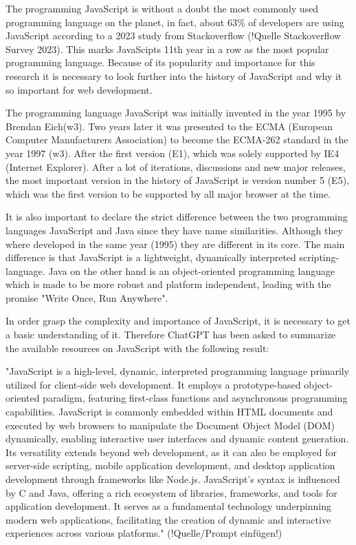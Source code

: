 The programming JavaScript is without a doubt the most commonly used programming language on the planet, in fact, about 63\% of developers are using JavaScript according to a 2023 study from Stackoverflow (!Quelle Stackoverflow Survey 2023). This marks JavaScipts 11th year in a row as the most popular programming language. Because of its popularity and importance for this research it is necessary to look further into the history of JavaScript and why it so important for web development.

The programming language JavaScript was initially invented in the year 1995 by Brendan Eich(w3). Two years later it was presented to the ECMA (European Computer Manufacturers Association) to become the ECMA-262 standard in the year 1997 (w3). After the first version (E1), which was solely supported by IE4 (Internet Explorer).
After a lot of iterations, discussions and new major releases, the most important version in the history of JavaScript is version number 5 (E5), which was the first version to be supported by all major browser at the time.

It is also important to declare the strict difference between the two programming languages JavaScript and Java since they have name similarities. Although they where developed in the same year (1995) they are different in its core. The main difference is that JavaScript is a lightweight, dynamically interpreted scripting-language. Java on the other hand is an object-oriented programming language which is made to be more robust and platform independent, leading with the promise "Write Once, Run Anywhere".

In order grasp the complexity and importance of JavaScript, it is necessary to get a basic understanding of it. Therefore ChatGPT has been asked to summarize the available resources on JavaScript with the following result:

"JavaScript is a high-level, dynamic, interpreted programming language primarily utilized for client-side web development. It employs a prototype-based object-oriented paradigm, featuring first-class functions and asynchronous programming capabilities. JavaScript is commonly embedded within HTML documents and executed by web browsers to manipulate the Document Object Model (DOM) dynamically, enabling interactive user interfaces and dynamic content generation. Its versatility extends beyond web development, as it can also be employed for server-side scripting, mobile application development, and desktop application development through frameworks like Node.js. JavaScript's syntax is influenced by C and Java, offering a rich ecosystem of libraries, frameworks, and tools for application development. It serves as a fundamental technology underpinning modern web applications, facilitating the creation of dynamic and interactive experiences across various platforms." (!Quelle/Prompt einfügen!)

